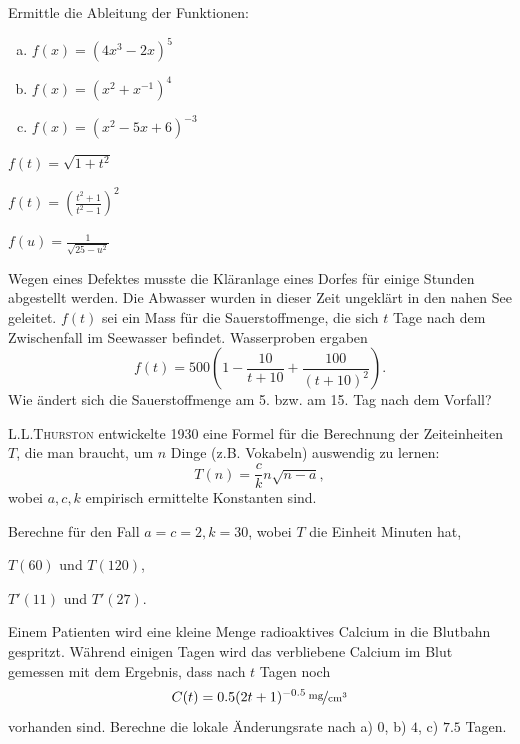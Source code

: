 \documentclass[%
11pt,%
twoside,%
titlepage,%
german,%
headsepline%
]{scrartcl}
\begin{document}
\begin{ueb}\label{uebkettenregel}
Ermittle die Ableitung der Funktionen:

\begin{minipage}{0.45\textwidth}
\begin{enumerate}[a)]
    \item $f(x)=(4x^3-2x)^5$
    \item $f(x)=(x^2+x^{-1})^4$
    \item $f(x)=(x^2-5x+6)^{-3}$
\end{enumerate}
\end{minipage}
\begin{minipage}{0.45\textwidth}
\begin{enumeratea}
\setcounter{enumi}{3}
\item $f(t)=\sqrt{1+t^2}$
\item $f(t)=\left(\frac{t^2+1}{t^2-1}\right)^2$
\item $f(u)=\frac{1}{\sqrt{25-u^2}}$
\end{enumeratea}
\end{minipage}
\end{ueb}

\begin{ueb}[Kläranlage]\label{uebklaranlage}
Wegen eines Defektes musste die Kl\"aranlage eines Dorfes f\"ur einige Stunden abgestellt werden. Die Abwasser wurden in dieser Zeit ungekl\"art in den nahen See geleitet. $f(t)$ sei ein Mass f\"ur die Sauerstoffmenge, die sich $t$ Tage nach dem Zwischenfall im Seewasser befindet. Wasserproben ergaben
$$f(t)=500\left(1-\frac{10}{t+10}+\frac{100}{(t+10)^2}\right).$$
Wie \"andert sich die Sauerstoffmenge am 5. bzw. am 15. Tag nach dem Vorfall?
\end{ueb}

\begin{ueb}[Vochi]\label{uebvoci}
\textsc{L.L.Thurston} entwickelte 1930 eine Formel f\"ur die Berechnung der Zeiteinheiten $T$, die man braucht, um $n$ Dinge (z.B. Vokabeln) auswendig zu lernen:
$$T(n)=\frac{c}{k}n\sqrt{n-a},$$
wobei $a,c,k$ empirisch ermittelte Konstanten sind.

Berechne f\"ur den Fall $a=c=2, k=30$, wobei $T$ die Einheit Minuten hat,
\begin{enumeratea}
\item $T(60)$ und $T(120)$,
\item $T'(11)$ und $T'(27)$.
\end{enumeratea}
\end{ueb}
\begin{ueb}[Calcium]\label{uebcalcium}
Einem Patienten wird eine kleine Menge radioaktives Calcium in die Blutbahn gespritzt. W\"ahrend einigen Tagen wird das verbliebene Calcium im Blut gemessen mit dem Ergebnis, dass nach $t$ Tagen noch
$$C(t)=\unitfrac[0.5(2t+1)^{-0.5}]{mg}{cm^3}$$
vorhanden sind. Berechne die lokale \"Anderungsrate nach a) $0$, b) $4$, c) $7.5$ Tagen.
\end{ueb}
\end{document}
